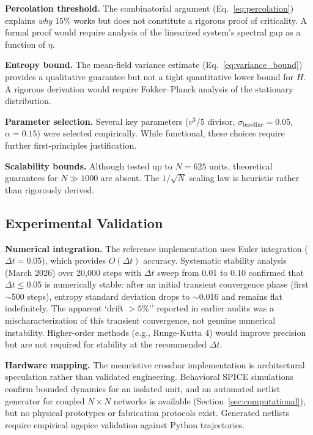 \documentclass[11pt]{article}
\begin{document}
\textbf{Percolation threshold.} The combinatorial argument (Eq.~\ref{eq:percolation}) explains \emph{why} 15\% works but does not constitute a rigorous proof of criticality. A formal proof would require analysis of the linearized system's spectral gap as a function of $\eta$.

\textbf{Entropy bound.} The mean-field variance estimate (Eq.~\ref{eq:variance_bound}) provides a qualitative guarantee but not a tight quantitative lower bound for $H$. A rigorous derivation would require Fokker--Planck analysis of the stationary distribution.

\textbf{Parameter selection.} Several key parameters ($v^3/5$ divisor, $\sigma_{\text{baseline}}=0.05$, $\alpha=0.15$) were selected empirically. While functional, these choices require further first-principles justification.

\textbf{Scalability bounds.} Although tested up to $N=625$ units, theoretical guarantees for $N \gg 1000$ are absent. The $1/\sqrt{N}$ scaling law is heuristic rather than rigorously derived.

\subsection{Experimental Validation}

\textbf{Numerical integration.} The reference implementation uses Euler integration ($\Delta t = 0.05$), which provides $O(\Delta t)$ accuracy. Systematic stability analysis (March 2026) over 20{,}000 steps with $\Delta t$ sweep from 0.01 to 0.10 confirmed that $\Delta t \leq 0.05$ is numerically stable: after an initial transient convergence phase (first $\sim$500 steps), entropy standard deviation drops to $\sim$0.016 and remains flat indefinitely. The apparent `drift $>5$\%'' reported in earlier audits was a mischaracterization of this transient convergence, not genuine numerical instability. Higher-order methods (e.g., Runge-Kutta 4) would improve precision but are not required for stability at the recommended $\Delta t$.

\textbf{Hardware mapping.} The memristive crossbar implementation is architectural speculation rather than validated engineering. Behavioral SPICE simulations confirm bounded dynamics for an isolated unit, and an automated netlist generator for coupled $N \times N$ networks is available (Section~\ref{sec:computational}), but no physical prototypes or fabrication protocols exist. Generated netlists require empirical ngspice validation against Python trajectories.
\end{document}
